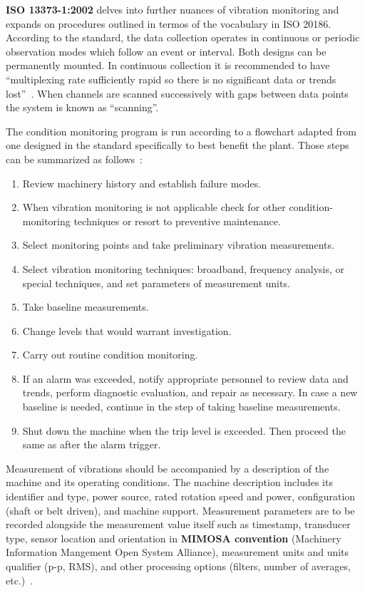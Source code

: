 \textbf{ISO 13373-1:2002} delves into further nuances of vibration monitoring and expands on procedures outlined in termos of the vocabulary in ISO 20186. According to the standard, the data collection operates in continuous or periodic observation modes which follow an event or interval. Both designs can be permanently mounted. In continuous collection it is recommended to have ``multiplexing rate sufficiently rapid so there is no significant data or trends lost''~\cite{noauthor_iso_2002}. When channels are scanned successively with gaps between data points the system is known as ``scanning''.

The condition monitoring program is run according to a flowchart adapted from one designed in the standard specifically to best benefit the plant. Those steps can be summarized as follows~\cite{noauthor_iso_2002}:
\begin{enumerate}
\itemsep0pt
\item Review machinery history and establish failure modes.
\item When vibration monitoring is not applicable check for other condition-monitoring techniques or resort to preventive maintenance.
\item Select monitoring points and take preliminary vibration measurements.
\item Select vibration monitoring techniques: broadband, frequency analysis, or special techniques, and set parameters of measurement units.
\item Take baseline measurements.
\item Change levels that would warrant investigation.
\item Carry out routine condition monitoring.
\item If an alarm was exceeded, notify appropriate personnel to review data and trends, perform diagnostic evaluation, and repair as necessary. In case a new baseline is needed, continue in the step of taking baseline measurements.
\item Shut down the machine when the trip level is exceeded. Then proceed the same as after the alarm trigger.
\end{enumerate}

Measurement of vibrations should be accompanied by a description of the machine and its operating conditions. The machine description includes its identifier and type, power source, rated rotation speed and power, configuration (shaft or belt driven), and machine support. Measurement parameters are to be recorded alongside the measurement value itself such as timestamp, transducer type, sensor location and orientation in \textbf{MIMOSA convention} (Machinery Information Mangement Open System Alliance), measurement units and units qualifier (p-p, RMS), and other processing options (filters, number of averages, etc.)~\cite{noauthor_iso_2002}.

